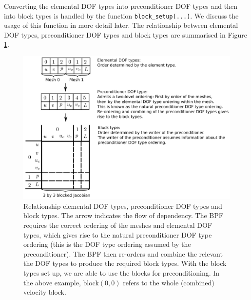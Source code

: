 Converting the elemental DOF types into preconditioner DOF types and then into 
block types is handled by the function \texttt{block\_\allowbreak setup(...)}.
We discuss the usage of this function in more detail later. The relationship 
between elemental DOF types, preconditioner DOF types and block types are 
summarised in Figure \ref{fig:dof_block_type_relations_crop_val}.
\begin{figure}[H]
\centering
\includegraphics[width=1\textwidth]{./pic/dof_block_type_relations_crop.pdf}
\caption{Relationship elemental DOF types, preconditioner DOF types and block
  types. The arrow indicates the flow of dependency. The BPF requires the
  correct ordering of the meshes and elemental DOF types, which gives rise to
  the natural preconditioner DOF type ordering (this is the DOF type ordering
  assumed by the preconditioner). The BPF then re-orders and combine the
  relevant the DOF types to produce the required block types. With the block
  types set up, we are able to use the blocks for preconditioning. In the above
  example, block$(0,0)$ refers to the whole (combined) velocity block.}
\label{fig:dof_block_type_relations_crop_val}
\end{figure}






